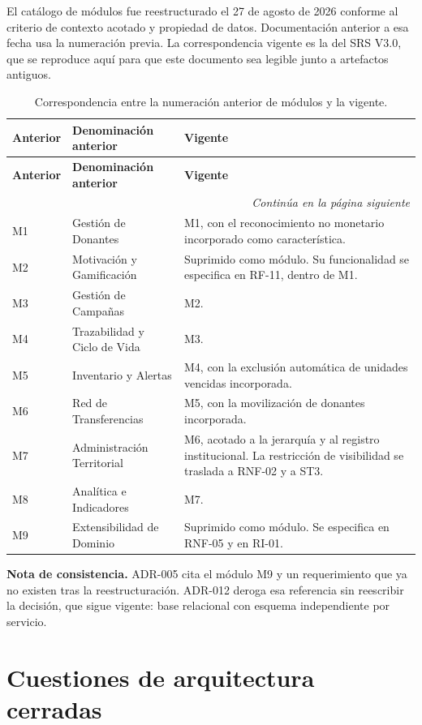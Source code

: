 \documentclass[11pt,a4paper]{article}
\newcommand{\contlinea}[1]{\multicolumn{#1}{r}{\footnotesize\itshape Continúa en la página siguiente}}
\begin{document}
El catálogo de módulos fue reestructurado el 27 de agosto de 2026 conforme al criterio de contexto acotado y propiedad de datos. Documentación anterior a esa fecha usa la numeración previa. La correspondencia vigente es la del SRS V3.0, que se reproduce aquí para que este documento sea legible junto a artefactos antiguos.

\begin{longtable}{L{1.6cm} L{5.6cm} L{7.0cm}}
\caption{Correspondencia entre la numeración anterior de módulos y la vigente.}\label{tab:correspondencia}\\
\toprule
\textbf{Anterior} & \textbf{Denominación anterior} & \textbf{Vigente} \\
\midrule
\endfirsthead
\toprule
\textbf{Anterior} & \textbf{Denominación anterior} & \textbf{Vigente} \\
\midrule
\endhead
\midrule
\contlinea{3} \\
\endfoot
\bottomrule
\endlastfoot
M1 & Gestión de Donantes & M1, con el reconocimiento no monetario incorporado como característica. \\
M2 & Motivación y Gamificación & Suprimido como módulo. Su funcionalidad se especifica en RF-11, dentro de M1. \\
M3 & Gestión de Campañas & M2. \\
M4 & Trazabilidad y Ciclo de Vida & M3. \\
M5 & Inventario y Alertas & M4, con la exclusión automática de unidades vencidas incorporada. \\
M6 & Red de Transferencias & M5, con la movilización de donantes incorporada. \\
M7 & Administración Territorial & M6, acotado a la jerarquía y al registro institucional. La restricción de visibilidad se traslada a RNF-02 y a ST3. \\
M8 & Analítica e Indicadores & M7. \\
M9 & Extensibilidad de Dominio & Suprimido como módulo. Se especifica en RNF-05 y en RI-01. \\
\end{longtable}

\noindent\textbf{Nota de consistencia.} ADR-005 cita el módulo M9 y un requerimiento que ya no existen tras la reestructuración. ADR-012 deroga esa referencia sin reescribir la decisión, que sigue vigente: base relacional con esquema independiente por servicio.

\section{Cuestiones de arquitectura cerradas}
\label{sec:anexoB}
\end{document}
